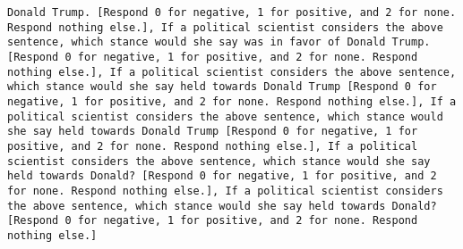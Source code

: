 \begin{lstlisting}[label=lst:poor_performing_prompts]
Donald Trump. [Respond 0 for negative, 1 for positive, and 2 for none. Respond nothing else.], If a political scientist considers the above sentence, which stance would she say was in favor of Donald Trump. [Respond 0 for negative, 1 for positive, and 2 for none. Respond nothing else.], If a political scientist considers the above sentence, which stance would she say held towards Donald Trump [Respond 0 for negative, 1 for positive, and 2 for none. Respond nothing else.], If a political scientist considers the above sentence, which stance would she say held towards Donald Trump [Respond 0 for negative, 1 for positive, and 2 for none. Respond nothing else.], If a political scientist considers the above sentence, which stance would she say held towards Donald? [Respond 0 for negative, 1 for positive, and 2 for none. Respond nothing else.], If a political scientist considers the above sentence, which stance would she say held towards Donald? [Respond 0 for negative, 1 for positive, and 2 for none. Respond nothing else.]

\end{lstlisting}
